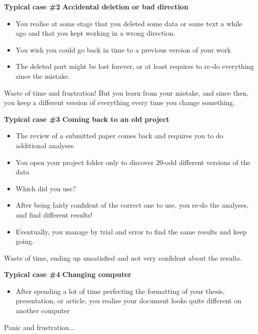 \documentclass[9pt,xcolor=pdftex,dvipsnames,table]{beamer}
\begin{document}
\begin{frame}{\textbf{Typical case \#2}}
\textbf{Accidental deletion or bad direction}
\begin{itemize}
\item You realise at some stage that you deleted some data or some
  text a while ago and that you kept working in a wrong direction.
\item You wish you could go back in time to a previous version of your
  work
\item The deleted part might be lost forever, or at least requires to
  re-do everything since the mistake.
\end{itemize}
\vspace{0.6cm}
Waste of time and frustration! But you learn from your mistake, and
since then, you keep a different version of everything every time you
change something.
\vspace{-0.5cm}
\end{frame}

\begin{frame}{\textbf{Typical case \#3}}
\textbf{Coming back to an old project}
\begin{itemize}
\item The review of a submitted paper comes back and requires you to
  do additional analyses
\item You open your project folder only to discover 20-odd different
  versions of the data
\item Which did you use?
\item After being fairly confident of the correct one to use, you
  re-do the analyses, and find different results!
\item Eventually, you manage by trial and error to find the same
  results and keep going.
\end{itemize}
\vspace{0.6cm}
Waste of time, ending up unsatisfied and not very confident about the results.
\vspace{-0.5cm}
\end{frame}


\begin{frame}{\textbf{Typical case \#4}}
\textbf{Changing computer}
\begin{itemize}
\item After spending a lot of time perfecting the formatting of your
  thesis, presentation, or article, you realise your document looks
  quite different on another computer
\end{itemize}
\vspace{0.6cm}
Panic and frustration...
\vspace{-0.5cm}
\end{frame}
\end{document}
